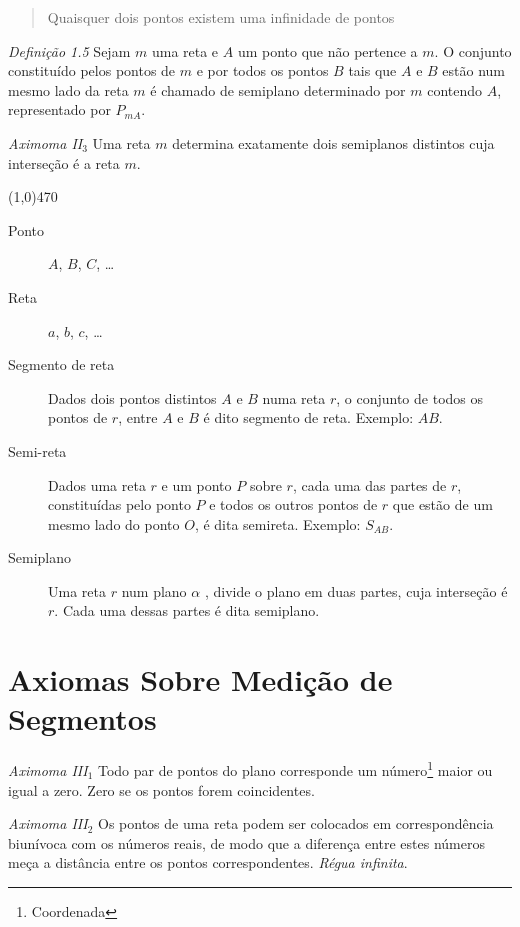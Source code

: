 \documentclass[11pt]{article}
\begin{document}
\begin{quote}
  Quaisquer dois pontos existem uma infinidade de pontos
\end{quote}

\emph{Definição 1.5} Sejam $m$ uma reta e $A$ um ponto que não pertence a
$m$. O conjunto constituído pelos pontos de $m$ e por todos os pontos $B$ tais
que $A$ e $B$ estão num mesmo lado da reta $m$ é chamado de semiplano
determinado por $m$ contendo $A$, representado por $P_{mA}$.

\emph{Aximoma II$_{3}$} Uma reta $m$ determina exatamente dois semiplanos distintos
cuja interseção é a reta $m$.

\line(1,0){470}

\begin{description}
  \item[Ponto] $A$, $B$, $C$, \ldots

  \item[Reta] $a$, $b$, $c$, \ldots

  \item[Segmento de reta]
  Dados dois pontos distintos $A$ e $B$ numa reta $r$, o conjunto de todos os
  pontos de $r$, entre $A$ e $B$ é dito segmento de reta. Exemplo: $AB$.

  \item[Semi-reta]
  Dados uma reta $r$ e um ponto $P$ sobre $r$, cada uma das partes de $r$,
  constituídas pelo ponto $P$ e todos os outros pontos de $r$ que estão de um
  mesmo lado do ponto $O$, é dita semireta. Exemplo: $S_{AB}$.

  \item[Semiplano]
  Uma reta $r$ num plano $\alpha$ , divide o plano em duas partes, cuja
  interseção é $r$. Cada uma dessas partes é dita semiplano.
\end{description}

\section{Axiomas Sobre Medição de Segmentos}

\emph{Aximoma III$_{1}$} Todo par de pontos do plano corresponde um
número\footnote{Coordenada} maior ou igual a zero. Zero se os pontos forem
coincidentes.

\emph{Aximoma III$_{2}$} Os pontos de uma reta podem ser colocados em
correspondência biunívoca com os números reais, de modo que a diferença entre
estes números meça a distância entre os pontos correspondentes. \emph{Régua
infinita}.
\end{document}
